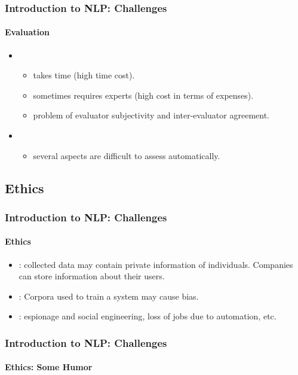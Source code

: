 \documentclass[xcolor=table]{beamer}
\begin{document}
\begin{frame}
\frametitle{Introduction to NLP: Challenges}
\framesubtitle{Evaluation}

\begin{itemize}
	\item {}
	\begin{itemize}
		\item takes time (high time cost).
		\item sometimes requires experts (high cost in terms of expenses).
		\item problem of evaluator subjectivity and inter-evaluator agreement.
	\end{itemize}
	\item {}
	\begin{itemize}
		\item several aspects are difficult to assess automatically.
	\end{itemize}
\end{itemize}

\end{frame}

\subsection{Ethics}

\begin{frame}
\frametitle{Introduction to NLP: Challenges}
\framesubtitle{Ethics}

\begin{itemize}
	\item {}: collected data may contain private information of individuals. Companies can store information about their users.
	\item {}: Corpora used to train a system may cause bias.
	\item {}: espionage and social engineering, loss of jobs due to automation, etc.
\end{itemize}

\end{frame}

\begin{frame}
\frametitle{Introduction to NLP: Challenges}
\framesubtitle{Ethics: Some Humor}

\begin{center}
\end{center}

\end{frame}

\end{document}
